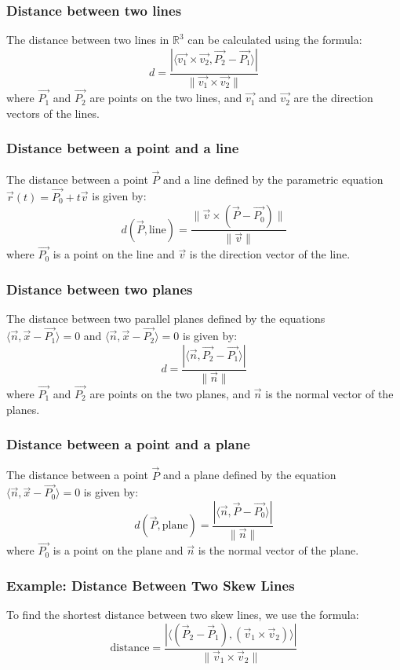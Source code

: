 \subsubsection*{Distance between two lines}
The distance between two lines in $\mathbb{R}^3$ can be calculated using the formula:
\[
	d = \frac{|\langle \vec{v_1} \times \vec{v_2}, \vec{P_2} - \vec{P_1} \rangle|}{\|\vec{v_1} \times \vec{v_2}\|}
\]
where $\vec{P_1}$ and $\vec{P_2}$ are points on the two lines, and $\vec{v_1}$ and $\vec{v_2}$ are the direction vectors of the lines.
\subsubsection*{Distance between a point and a line}
The distance between a point $\vec{P}$ and a line defined by the parametric equation $\vec{r}(t) = \vec{P_0} + t\vec{v}$ is given by:
\[
	d(\vec{P}, \text{line}) = \frac{\|\vec{v} \times (\vec{P} - \vec{P_0})\|}{\|\vec{v}\|}
\]
where $\vec{P_0}$ is a point on the line and $\vec{v}$ is the direction vector of the line.
\subsubsection*{Distance between two planes}
The distance between two parallel planes defined by the equations $\langle \vec{n}, \vec{x} - \vec{P_1} \rangle = 0$ and $\langle \vec{n}, \vec{x} - \vec{P_2} \rangle = 0$ is given by:
\[
	d = \frac{|\langle \vec{n}, \vec{P_2} - \vec{P_1} \rangle|}{\|\vec{n}\|}
\]
where $\vec{P_1}$ and $\vec{P_2}$ are points on the two planes, and $\vec{n}$ is the normal vector of the planes.
\subsubsection*{Distance between a point and a plane}
The distance between a point $\vec{P}$ and a plane defined by the equation $\langle \vec{n}, \vec{x} - \vec{P_0} \rangle = 0$ is given by:
\[
	d(\vec{P}, \text{plane}) = \frac{|\langle \vec{n}, \vec{P} - \vec{P_0} \rangle|}{\|\vec{n}\|}
\]
where $\vec{P_0}$ is a point on the plane and $\vec{n}$ is the normal vector of the plane.

\subsubsection{Example: Distance Between Two Skew Lines}

To find the shortest distance between two skew lines, we use the formula:
\[
	\text{distance} = \frac{|\langle(\vec{P}_2 - \vec{P}_1), (\vec{v}_1 \times \vec{v}_2)\rangle|}{\|\vec{v}_1 \times \vec{v}_2\|}
\]

